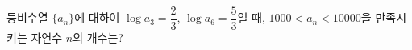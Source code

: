 등비수열 $\{a_n\}$에 대하여 $\log a_3=\dfrac{2}{3}$, $\log a_6=\dfrac{5}{3}$일 때, $1000<a_n<10000$을 만족시키는 자연수 $n$의 개수는?
